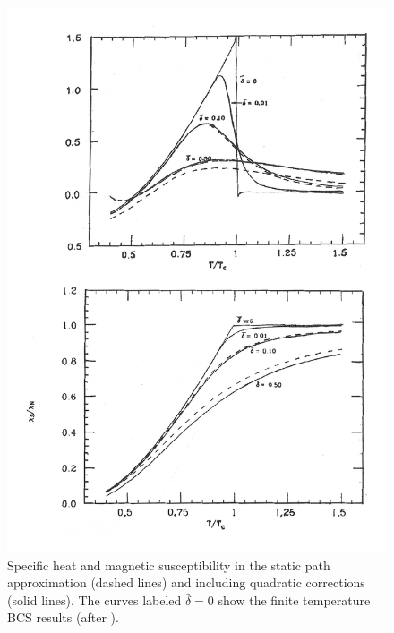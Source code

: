 \begin{subappendices}
\begin{figure}
 \centerline{\includegraphics*[width=12cm,angle=0]{nutshell/figs/fig2E1.pdf}}
 \caption{Specific heat and magnetic susceptibility in the static path approximation (dashed lines) and including quadratic corrections (solid lines). The curves labeled $\bar\delta=0$ show the finite temperature BCS results (after \cite{Lauritzen:93}).}\label{fig2.E.1}
 \end{figure}
\begin{figure}

\end{figure}
\end{subappendices}
